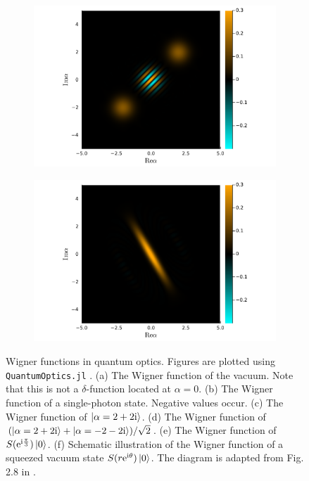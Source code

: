 \documentclass[hyperref, a4paper]{article}
\newcommand*{\ii}{\mathrm{i}}
\newcommand*{\ee}{\mathrm{e}}
\begin{document}
\begin{figure}
\begin{subfigure}{0.45\textwidth}
        \subcaption{}
    \end{subfigure}
    \begin{subfigure}{0.45\textwidth}
        \centering
        \includegraphics[width=\textwidth]{heatmaps/coherent-state-composition.pdf}
        \subcaption{} 
    \end{subfigure}
    \begin{subfigure}{0.45\textwidth}
        \centering
        \includegraphics[width=\textwidth]{heatmaps/squeezed-state.pdf}
        \subcaption{}
    \end{subfigure}
    \begin{subfigure}{0.45\textwidth}
        
        \subcaption{}
    \end{subfigure}
    \caption{Wigner functions in quantum optics. 
    Figures are plotted using \texttt{QuantumOptics.jl} \cite{kramer2018quantumoptics}.
    (a) The Wigner function of the vacuum. Note that this is not a $\delta$-function located at $\alpha = 0$.
    (b) The Wigner function of a single-photon state. Negative values occur.
    (c) The Wigner function of $\ket{\alpha = 2 + 2\ii}$.
    (d) The Wigner function of $(\ket{\alpha = 2 + 2 \ii} + \ket{\alpha = - 2 - 2 \ii}) / \sqrt{2}$.
    (e) The Wigner function of $S(\ee^{\ii \frac{\pi}{3}}) \ket{0}$.
    (f) Schematic illustration of the Wigner function of a squeezed vacuum state
    $S(r\ee^{\ii \theta}) \ket{0}$.
    The diagram is adapted from Fig. 2.8 in \cite{scully1999quantum}.
    }
    \label{fig:wigner-example}
\end{figure}
\end{document}
